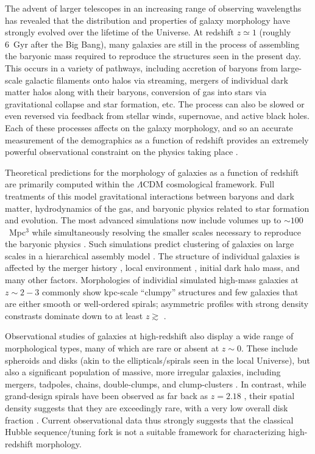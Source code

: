 \documentclass[usenatbib]{mn2e}
\begin{document}
The advent of larger telescopes in an increasing range of observing wavelengths has revealed that the distribution and properties of galaxy morphology have strongly evolved over the lifetime of the Universe. At redshift $z\simeq1$ (roughly 6~Gyr after the Big Bang), many galaxies are still in the process of assembling the baryonic mass required to reproduce the structures seen in the present day. This occurs in a variety of pathways, including accretion of baryons from large-scale galactic filaments onto halos via streaming, mergers of individual dark matter halos along with their baryons, conversion of gas into stars via gravitational collapse and star formation, etc. The process can also be slowed or even reversed via feedback from stellar winds, supernovae, and active black holes. Each of these processes affects on the galaxy morphology, and so an accurate measurement of the demographics as a function of redshift provides an extremely powerful observational constraint on the physics taking place \citep[for a recent review see][]{con14}. 

Theoretical predictions for the morphology of galaxies as a function of redshift are primarily computed within the $\Lambda$CDM cosmological framework. Full treatments of this model gravitational interactions between baryons and dark matter, hydrodynamics of the gas, and baryonic physics related to star formation and evolution. The most advanced simulations now include volumes up to $\sim100$~Mpc$^3$ while simultaneously resolving the smaller scales necessary to reproduce the baryonic physics \citep{vog14a,sch15}. Such simulations predict clustering of galaxies on large scales in a hierarchical assembly model \citep{sil12}. The structure of individual galaxies is affected by the merger history \citep{too72,hop10}, local environment \citep[such as the morphology-density relation;][]{dre80}, initial dark halo mass, and many other factors. Morphologies of individial simulated high-mass galaxies at $z\sim2-3$ commonly show kpc-scale ``clumpy'' structures and few galaxies that are either smooth or well-ordered spirals; asymmetric profiles with strong density constrasts dominate down to at least $z\gtrsim$ \citep{gen14}. 

Observational studies of galaxies at high-redshift also display a wide range of morphological types, many of which are rare or absent at $z\sim0$. These include spheroids and disks (akin to the ellipticals/spirals seen in the local Universe), but also a significant population of massive, more irregular galaxies, including mergers, tadpoles, chains, double-clumps, and clump-clusters \citep{elm05,elm07,cam11a,for11a,kar15}. In contrast, while grand-design spirals have been observed as far back as $z=2.18$ \citep{law12}, their spatial density suggests that they are exceedingly rare, with a very low overall disk fraction \citep{mor13}. Current observational data thus strongly suggests that the classical Hubble sequence/tuning fork \citep{hub36} is not a suitable framework for characterizing high-redshift morphology. 
\end{document}
